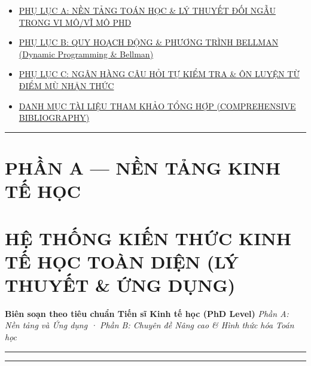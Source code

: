 \documentclass[
]{article}
\providecommand{\tightlist}{%
  \setlength{\itemsep}{0pt}\setlength{\parskip}{0pt}}
\begin{document}
\begin{itemize}
  \begin{itemize}
  \tightlist
  \item
    \hyperref[phux1ee5-lux1ee5c-a-nux1ec1n-tux1ea3ng-touxe1n-hux1ecdc--luxfd-thuyux1ebft-ux111ux1ed1i-ngux1eabu-trong-vi-muxf4vux129-muxf4-phd]{PHỤ
    LỤC A: NỀN TẢNG TOÁN HỌC \& LÝ THUYẾT ĐỐI NGẪU TRONG VI MÔ/VĨ MÔ
    PHD}
  \item
    \hyperref[phux1ee5-lux1ee5c-b-quy-houx1ea1ch-ux111ux1ed9ng--phux1b0ux1a1ng-truxecnh-bellman-dynamic-programming--bellman]{PHỤ
    LỤC B: QUY HOẠCH ĐỘNG \& PHƯƠNG TRÌNH BELLMAN (Dynamic Programming
    \& Bellman)}
  \item
    \hyperref[phux1ee5-lux1ee5c-c-nguxe2n-huxe0ng-cuxe2u-hux1ecfi-tux1ef1-kiux1ec3m-tra--uxf4n-luyux1ec7n-tux1eeb-ux111iux1ec3m-muxf9-nhux1eadn-thux1ee9c-self-assessment-bank]{PHỤ
    LỤC C: NGÂN HÀNG CÂU HỎI TỰ KIỂM TRA \& ÔN LUYỆN TỪ ĐIỂM MÙ NHẬN
    THỨC}
  \item
    \hyperref[danh-mux1ee5c-tuxe0i-liux1ec7u-tham-khux1ea3o-tux1ed5ng-hux1ee3p-comprehensive-bibliography]{DANH
    MỤC TÀI LIỆU THAM KHẢO TỔNG HỢP (COMPREHENSIVE BIBLIOGRAPHY)}
  \end{itemize}
\end{itemize}

\begin{center}\rule{0.5\linewidth}{0.5pt}\end{center}

\section{PHẦN A --- NỀN TẢNG KINH TẾ
HỌC}\label{phux1ea7n-a-nux1ec1n-tux1ea3ng-kinh-tux1ebf-hux1ecdc}

\section{HỆ THỐNG KIẾN THỨC KINH TẾ HỌC TOÀN DIỆN (LÝ THUYẾT \& ỨNG
DỤNG)}\label{hux1ec7-thux1ed1ng-kiux1ebfn-thux1ee9c-kinh-tux1ebf-hux1ecdc-touxe0n-diux1ec7n-luxfd-thuyux1ebft-ux1ee9ng-dux1ee5ng}

\textbf{Biên soạn theo tiêu chuẩn Tiến sĩ Kinh tế học (PhD Level)}
\emph{Phần A: Nền tảng và Ứng dụng · Phần B: Chuyên đề Nâng cao \& Hình
thức hóa Toán học}

\begin{center}\rule{0.5\linewidth}{0.5pt}\end{center}

\begin{center}\rule{0.5\linewidth}{0.5pt}\end{center}
\end{document}
